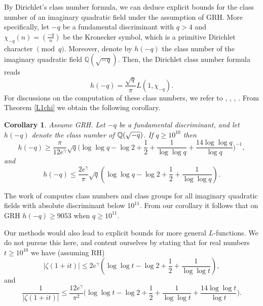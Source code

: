 \documentclass [12pt]{amsart}
\newtheorem{corol}{Corollary}[section]
\numberwithin{equation}{section}
\begin{document}
By Dirichlet's class number formula, we can deduce explicit bounds for the class number of an imaginary quadratic field under the assumption of GRH. More specifically, let $-q$ be a fundamental discriminant with $q>4$ and $\chi_{-q}(n)=\left(\frac{-q}{n}\right)$ be the Kronecker symbol, which is a primitive Dirichlet character $\pmod q$. Moreover, denote by $h(-q)$ the class number of the imaginary quadratic field $\mathbb{Q}(\sqrt{-q})$. Then, the Dirichlet class number formula reads
\begin{equation}\label{ClassFormula}
 h(-q)= \frac{\sqrt{q}}{\pi}L(1,\chi_{-q}).
\end{equation}
For discussions on the computation of these 
class numbers, we refer to \cite{Bo}, \cite{HaMc}, \cite{JRW}, \cite{Wat}.  From Theorem \ref{L1chi} 
we obtain the following corollary.  

\begin{corol}\label{ClassBounds} Assume GRH. Let $-q$ be a fundamental discriminant, and 
let $h(-q)$ denote the class number of ${\Bbb Q}(\sqrt{-q})$.  If $q\ge 10^{10}$ 
then 
$$
h(-q)\geq \frac{\pi}{12e^{\gamma}} \sqrt{q}\Big( \log \log q -\log 2 +\frac 12 + \frac{1}{\log \log q}+\frac{14\log\log q}{\log q}\Big)^{-1},
$$ 
and
$$
h(-q)\leq \frac{2e^{\gamma}}{\pi}\sqrt{q}\left(\log\log q-\log 2+\frac{1}{2}+ \frac{1}{\log\log q}\right).
$$
\end{corol}

The work of  \cite{JRW} computes class numbers and class groups for all imaginary quadratic 
fields with absolute discriminant below $10^{11}$.  From our corollary it follows that on GRH $h(-q) \ge 9053$ 
when $q\ge 10^{11}$.  

Our methods would also lead to explicit bounds for more general $L$-functions.  
We do not pursue this here, and content ourselves by stating that for real 
numbers $t \ge 10^{10}$ we have (assuming RH) 
$$
|\zeta(1+it)|\leq 2e^{\gamma}\left(\log\log t-\log 2+\frac{1}{2}+ \frac{1}{\log\log t}\right),
$$
and
$$
\frac{1}{|\zeta(1+it)|}\leq \frac{12e^{\gamma}}{\pi^2} \Big( \log \log t -\log 2 +\frac 12 + \frac{1}{\log \log t}+\frac{14\log\log t}{\log t}\Big).
$$
 
\end{document}
